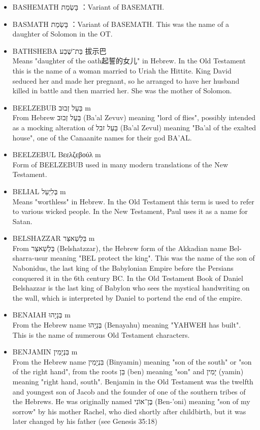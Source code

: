 \begin{itemize}
\item BASHEMATH בָּשְׂמַת ：Variant of BASEMATH.
\item BASMATH בָּשְׂמַת ：Variant of BASEMATH. This was the name of a daughter of Solomon in the OT.
\item {BATHSHEBA בַּת־שֶׁבַע 拔示巴}\\
Means "daughter of the oath起誓的女儿" in Hebrew. In the Old Testament this is the name of a woman married to Uriah the Hittite. King David seduced her and made her pregnant, so he arranged to have her husband killed in battle and then married her. She was the mother of Solomon.
\item {BEELZEBUB בַּעַל זְבוּב m}\\
From Hebrew בַּעַל זְבוּב (Ba'al Zevuv) meaning "lord of flies", possibly intended as a mocking alteration of בַּעַל זבל (Ba'al Zevul) meaning "Ba'al of the exalted house", one of the Canaanite names for their god BA'AL.
\item {BEELZEBUL Βεελζεβούλ m}\\
Form of BEELZEBUB used in many modern translations of the New Testament.
\item {BELIAL בְּלִיַעַל m}\\
Means "worthless" in Hebrew. In the Old Testament this term is used to refer to various wicked people. In the New Testament, Paul uses it as a name for Satan. 
\item {BELSHAZZAR בֵּלְשַׁאצַּר m}\\
From בֵּלְשַׁאצַּר (Belshatzzar), the Hebrew form of the Akkadian name Bel-sharra-usur meaning "BEL protect the king". This was the name of the son of Nabonidus, the last king of the Babylonian Empire before the Persians conquered it in the 6th century BC. In the Old Testament Book of Daniel Belshazzar is the last king of Babylon who sees the mystical handwriting on the wall, which is interpreted by Daniel to portend the end of the empire.
\item {BENAIAH בְּנָיָהוּ m}\\
From the Hebrew name בְּנָיָהוּ (Benayahu) meaning "YAHWEH has built". This is the name of numerous Old Testament characters.
\item {BENJAMIN בִּנְיָמִין m}\\
From the Hebrew name בִּנְיָמִין (Binyamin) meaning "son of the south" or "son of the right hand", from the roots בֵּן (ben) meaning "son" and יָמִין (yamin) meaning "right hand, south". Benjamin in the Old Testament was the twelfth and youngest son of Jacob and the founder of one of the southern tribes of the Hebrews. He was originally named בֶּן־אוֹנִי (Ben-'oni) meaning "son of my sorrow" by his mother Rachel, who died shortly after childbirth, but it was later changed by his father (see Genesis 35:18)

\end{itemize}
